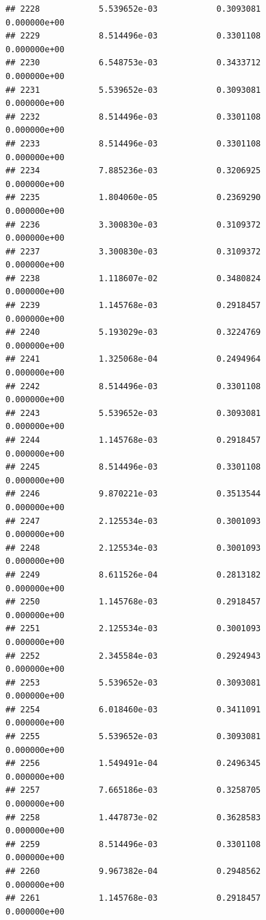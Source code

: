 \documentclass[
]{article}
\begin{document}
\begin{verbatim}
## 2228            5.539652e-03            0.3093081            0.000000e+00
## 2229            8.514496e-03            0.3301108            0.000000e+00
## 2230            6.548753e-03            0.3433712            0.000000e+00
## 2231            5.539652e-03            0.3093081            0.000000e+00
## 2232            8.514496e-03            0.3301108            0.000000e+00
## 2233            8.514496e-03            0.3301108            0.000000e+00
## 2234            7.885236e-03            0.3206925            0.000000e+00
## 2235            1.804060e-05            0.2369290            0.000000e+00
## 2236            3.300830e-03            0.3109372            0.000000e+00
## 2237            3.300830e-03            0.3109372            0.000000e+00
## 2238            1.118607e-02            0.3480824            0.000000e+00
## 2239            1.145768e-03            0.2918457            0.000000e+00
## 2240            5.193029e-03            0.3224769            0.000000e+00
## 2241            1.325068e-04            0.2494964            0.000000e+00
## 2242            8.514496e-03            0.3301108            0.000000e+00
## 2243            5.539652e-03            0.3093081            0.000000e+00
## 2244            1.145768e-03            0.2918457            0.000000e+00
## 2245            8.514496e-03            0.3301108            0.000000e+00
## 2246            9.870221e-03            0.3513544            0.000000e+00
## 2247            2.125534e-03            0.3001093            0.000000e+00
## 2248            2.125534e-03            0.3001093            0.000000e+00
## 2249            8.611526e-04            0.2813182            0.000000e+00
## 2250            1.145768e-03            0.2918457            0.000000e+00
## 2251            2.125534e-03            0.3001093            0.000000e+00
## 2252            2.345584e-03            0.2924943            0.000000e+00
## 2253            5.539652e-03            0.3093081            0.000000e+00
## 2254            6.018460e-03            0.3411091            0.000000e+00
## 2255            5.539652e-03            0.3093081            0.000000e+00
## 2256            1.549491e-04            0.2496345            0.000000e+00
## 2257            7.665186e-03            0.3258705            0.000000e+00
## 2258            1.447873e-02            0.3628583            0.000000e+00
## 2259            8.514496e-03            0.3301108            0.000000e+00
## 2260            9.967382e-04            0.2948562            0.000000e+00
## 2261            1.145768e-03            0.2918457            0.000000e+00

\end{verbatim}
\end{document}
